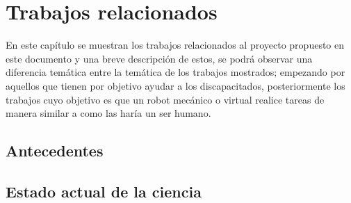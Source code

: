 
\chapter{Trabajos relacionados}
\label{sec:chapter2}

En este cap\'itulo se muestran los trabajos relacionados al proyecto propuesto
 en este documento y una breve descripci\'on de estos, se podr\'a observar una
 diferencia tem\'atica entre la tem\'atica de los trabajos mostrados; empezando 
 por aquellos que tienen por objetivo ayudar a los discapacitados, 
 posteriormente los trabajos cuyo objetivo es que un robot mec\'anico o virtual 
 realice tareas de manera similar a como las har\'ia un ser humano.
 

\section{Antecedentes}







\section{Estado actual de la ciencia}












